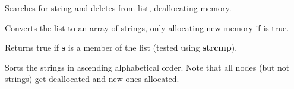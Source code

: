 
Searches for string and deletes from list, deallocating memory.

\label{wxstringlistlisttoarray}


Converts the list to an array of strings, only allocating new memory if
 is true.

\label{wxstringlistmember}


Returns true if {\bf s} is a member of the list (tested using {\bf strcmp}).

\label{wxstringlistsort}


Sorts the strings in ascending alphabetical order. Note that all nodes
(but not strings) get deallocated and new ones allocated.


